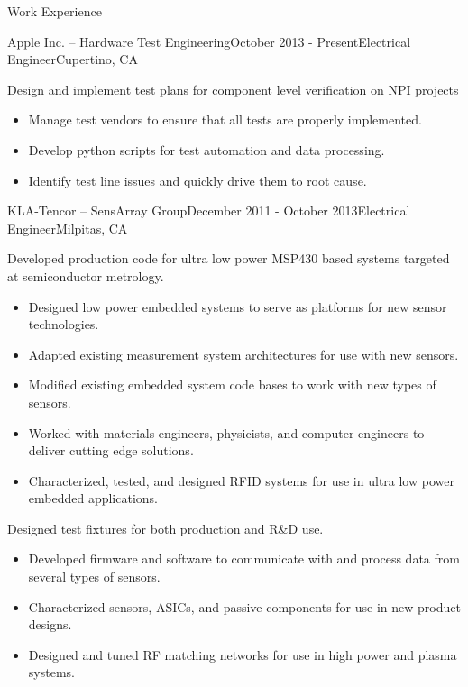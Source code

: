 \documentclass{resume} %
\begin{document}
\begin{rSection}{Work Experience}
\vspace{-0.5em}
\begin{rSubsection}{Apple Inc. -- Hardware Test Engineering}{October 2013 - Present}{Electrical Engineer}{Cupertino, CA}

\item Design and implement test plans for component level verification on NPI projects
\begin{itemize}
\itemsep -0.5em \vspace{-0.5em}
\renewcommand{\labelitemi}{-}
\item Manage test vendors to ensure that all tests are properly implemented.
\item Develop python scripts for test automation and data processing.
\item Identify test line issues and quickly drive them to root cause.
\end{itemize}
\end{rSubsection}


\begin{rSubsection}{KLA-Tencor -- SensArray Group}{December 2011 - October 2013}{Electrical Engineer}{Milpitas, CA}
\item Developed production code for ultra low power MSP430 based systems targeted at semiconductor metrology.
\begin{itemize}
\itemsep -0.5em \vspace{-0.5em}
\renewcommand{\labelitemi}{-}
\item Designed low power embedded systems to serve as platforms for new sensor technologies.
\item Adapted existing measurement system architectures for use with new sensors.
\item Modified existing embedded system code bases to work with new types of sensors.
\item Worked with materials engineers, physicists, and computer engineers to deliver cutting edge solutions.
\item Characterized, tested, and designed RFID systems for use in ultra low power embedded applications.
\end{itemize}

\item Designed test fixtures for both production and R\&D use.
\begin{itemize}
\itemsep -0.5em \vspace{-0.5em}
\renewcommand{\labelitemi}{-}
\item Developed firmware and software to communicate with and process data from several types of sensors.
\item Characterized sensors, ASICs, and passive components for use in new product designs.
\item Designed and tuned RF matching networks for use in high power and plasma systems.
\end{itemize}
\end{rSubsection}


\end{rSection}
\end{document}
